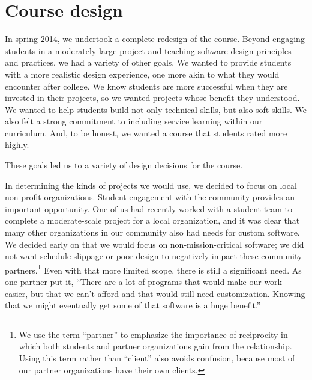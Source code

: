\section{Course design}

In spring 2014, we undertook a complete redesign of the course.
Beyond engaging students in a moderately large project and teaching
software design principles and practices, we had a variety of other
goals.  We wanted to provide students with a more realistic design
experience, one more akin to what they would encounter after college.
We know students are more successful when they are invested in their
projects, so we wanted projects whose benefit they understood.  We
wanted to help students build not only technical skills, but also
soft skills.%
We also felt a strong commitment to
including service learning within our curriculum.  And, to be
honest, we wanted a course that students rated more highly.

These goals led us to a variety of design decisions for the course.

In determining the kinds of projects we would use, we decided to
focus on local non-profit organizations.  Student engagement with
the community provides an important opportunity.  One of us had
recently worked with a student team to complete a moderate-scale
project for a local organization, and it was clear that many other
organizations in our community also had needs for custom software.
We decided early on that we would focus on non-mission-critical
software; we did not want schedule slippage or poor design to
negatively impact these community partners.\footnote{We use the term ``partner'' to emphasize the importance of
reciprocity in which both students and partner organizations gain
from the relationship.  Using this term rather than ``client'' also
avoids confusion, because most of our partner organizations have
their own clients.} Even with that more limited scope, there is
still a significant need.  As one partner put it, ``There are a lot
of programs that would make our work easier, but that we can't
afford and that would still need customization.  Knowing that we
might eventually get some of that software is a huge benefit.''

